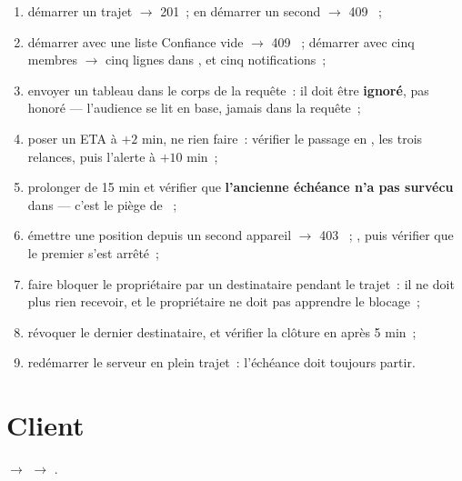 \begin{enumerate}[leftmargin=1.6em]
  \item démarrer un trajet $\rightarrow$ 201~; en démarrer un second $\rightarrow$ 409
        ~;
  \item démarrer avec une liste Confiance vide $\rightarrow$ 409
        ~; démarrer avec cinq membres $\rightarrow$ cinq lignes
        dans , et cinq notifications~;
  \item envoyer un tableau  dans le corps de la requête~: il doit être
        \textbf{ignoré}, pas honoré --- l'audience se lit en base, jamais dans la
        requête~;
  \item poser un ETA à $+2$ min, ne rien faire~: vérifier le passage en
        , les trois relances, puis l'alerte à $+10$ min~;
  \item prolonger de 15 min et vérifier que \textbf{l'ancienne échéance n'a pas survécu}
        dans  --- c'est le piège de ~;
  \item émettre une position depuis un second appareil $\rightarrow$ 403
        ~; , puis vérifier que le premier
        s'est arrêté~;
  \item faire bloquer le propriétaire par un destinataire pendant le trajet~: il ne doit
        plus rien recevoir, et le propriétaire ne doit pas apprendre le blocage~;
  \item révoquer le dernier destinataire, et vérifier la clôture en
         après 5 min~;
  \item redémarrer le serveur en plein trajet~: l'échéance doit toujours partir.
\end{enumerate}

\section{Client}

 $\rightarrow$
 $\rightarrow$
.

